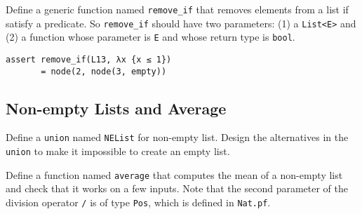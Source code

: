 \documentclass[12pt]{article}
\begin{document}
Define a generic function named \texttt{remove\_if} that removes elements
from a list if satisfy a predicate. So \texttt{remove\_if} should have two
parameters: (1) a \texttt{List<E>} and (2) a function whose parameter is \texttt{E} 
and whose return type is \texttt{bool}.

\begin{verbatim}
assert remove_if(L13, λx {x ≤ 1}) 
       = node(2, node(3, empty))
\end{verbatim}

\subsection{Non-empty Lists and Average}

Define a \texttt{union} named \texttt{NEList} for non-empty list.
Design the alternatives in the \texttt{union} to make it impossible to
create an empty list.

Define a function named \texttt{average} that computes the mean of a
non-empty list and check that it works on a few inputs.
Note that the second parameter of the division operator \texttt{/} 
is of type \texttt{Pos}, which is defined in \texttt{Nat.pf}.
\end{document}
